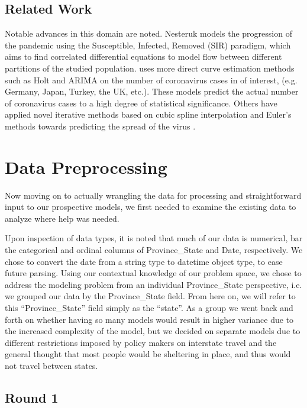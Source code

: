 \documentclass[sigconf,nonacm]{acmart}
\begin{document}
\subsection{Related Work}

Notable advances in this domain are noted. Nesteruk \cite{Nesteruk} models the
progression of the pandemic using the Susceptible, Infected, Removed (SIR)
paradigm, which aims to find correlated differential equations to model flow
between different partitions of the studied population. 
\cite{EJMO} uses more direct curve estimation methods such as Holt and ARIMA on
the number of coronavirus cases in of interest, (e.g. Germany, Japan, Turkey,
the UK, etc.). These models predict the actual number of coronavirus cases to a
high degree of statistical significance. 
Others have applied novel iterative methods based on cubic spline interpolation
and Euler's methods towards predicting the spread of the virus \cite{APPADU2020}.

\section{Data Preprocessing}

Now moving on to actually wrangling the data for processing and straightforward
input to our prospective models, we first needed to examine the existing data
to analyze where help was needed. 

Upon inspection of data types, it is noted
that much of our data is numerical, bar the categorical and ordinal columns of
Province\_State and Date, respectively. We chose to convert the date from a
string type to datetime object type, to ease future parsing. Using our
contextual knowledge of our problem space, we chose to address the modeling
problem from an individual Province\_State perspective, i.e. we grouped our
data by the Province\_State field. From here on, we will refer to this
“Province\_State” field simply as the “state”. As a group we went back and
forth on whether having so many models would result in higher variance due to
the increased complexity of the model, but we decided on separate models due to
different restrictions imposed by policy makers on interstate travel and the
general thought that most people would be sheltering in place, and thus would
not travel between states.

\subsection{Round 1}
\end{document}
